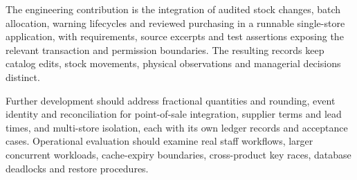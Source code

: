 The engineering contribution is the integration of audited stock changes, batch allocation, warning lifecycles and reviewed purchasing in a runnable single-store application, with requirements, source excerpts and test assertions exposing the relevant transaction and permission boundaries. The resulting records keep catalog edits, stock movements, physical observations and managerial decisions distinct.


Further development should address fractional quantities and rounding, event identity and reconciliation for point-of-sale integration, supplier terms and lead times, and multi-store isolation, each with its own ledger records and acceptance cases. Operational evaluation should examine real staff workflows, larger concurrent workloads, cache-expiry boundaries, cross-product key races, database deadlocks and restore procedures.

